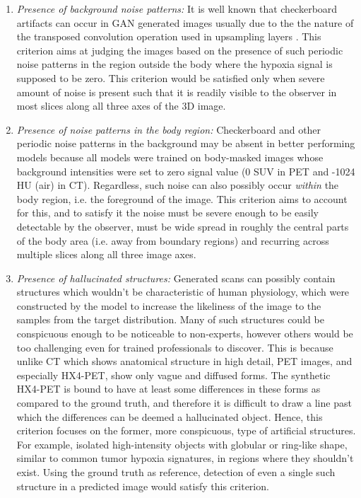 \begin{enumerate}
    \item \textit{Presence of background noise patterns:} It is well known that checkerboard artifacts can occur in GAN generated images usually due to the the nature of the transposed convolution operation used in upsampling layers \cite{odena2016deconvolution}. This criterion aims at judging the images based on the presence of such periodic noise patterns in the region outside the body where the hypoxia signal is supposed to be zero. This criterion would be satisfied only when severe amount of noise is present such that it is readily visible to the observer in most slices along all three axes of the 3D image.
    
    \item \textit{Presence of noise patterns in the body region:} Checkerboard and other periodic noise patterns in the background may be absent in better performing models because all models were trained on body-masked images whose background intensities were set to zero signal value (0 SUV in PET and -1024 HU (air) in CT). Regardless, such noise can also possibly occur \textit{within} the body region, i.e. the foreground of the image. This criterion aims to account for this, and to satisfy it the noise must be severe enough to be easily detectable by the observer, must be wide spread in roughly the central parts of the body area (i.e. away from boundary regions) and recurring across multiple slices along all three image axes. 
    
    \item \textit{Presence of hallucinated structures:} Generated scans can possibly contain structures which wouldn't be characteristic of human physiology, which were constructed by the model to increase the likeliness of the image to the samples from the target distribution. Many of such structures could be conspicuous enough to be noticeable to non-experts, however others would be too challenging even for trained professionals to discover. This is because unlike CT which shows anatomical structure in high detail, PET images, and especially HX4-PET, show only vague and diffused forms. The synthetic HX4-PET is bound to have at least some differences in these forms as compared to the ground truth, and therefore it is difficult to draw a line past which the differences can be deemed a hallucinated object. Hence, this criterion focuses on the former, more conspicuous, type of artificial structures. For example, isolated high-intensity objects with globular or ring-like shape, similar to common tumor hypoxia signatures, in regions where they shouldn't exist. Using the ground truth as reference, detection of even a single such structure in a predicted image would satisfy this criterion.
    

\end{enumerate}
